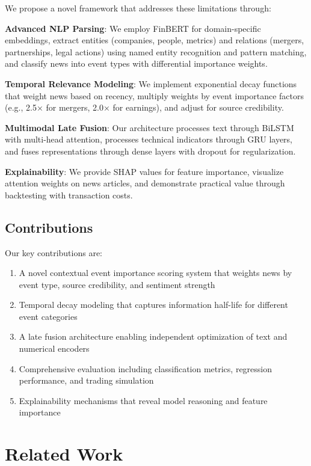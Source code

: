 \documentclass[conference]{IEEEtran}
\begin{document}
We propose a novel framework that addresses these limitations through:

\textbf{Advanced NLP Parsing}: We employ FinBERT \cite{finbert2020} for domain-specific embeddings, extract entities (companies, people, metrics) and relations (mergers, partnerships, legal actions) using named entity recognition and pattern matching, and classify news into event types with differential importance weights.

\textbf{Temporal Relevance Modeling}: We implement exponential decay functions that weight news based on recency, multiply weights by event importance factors (e.g., 2.5× for mergers, 2.0× for earnings), and adjust for source credibility.

\textbf{Multimodal Late Fusion}: Our architecture processes text through BiLSTM with multi-head attention, processes technical indicators through GRU layers, and fuses representations through dense layers with dropout for regularization.

\textbf{Explainability}: We provide SHAP values for feature importance, visualize attention weights on news articles, and demonstrate practical value through backtesting with transaction costs.

\subsection{Contributions}

Our key contributions are:

\begin{enumerate}
    \item A novel contextual event importance scoring system that weights news by event type, source credibility, and sentiment strength
    \item Temporal decay modeling that captures information half-life for different event categories
    \item A late fusion architecture enabling independent optimization of text and numerical encoders
    \item Comprehensive evaluation including classification metrics, regression performance, and trading simulation
    \item Explainability mechanisms that reveal model reasoning and feature importance
\end{enumerate}

\section{Related Work}
\end{document}
